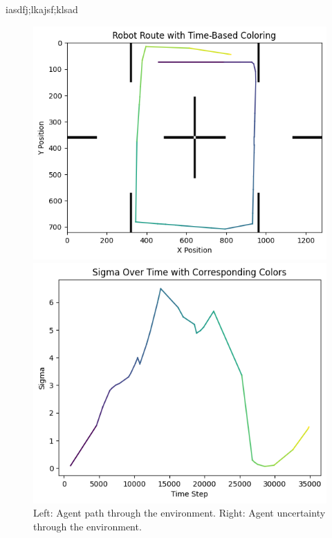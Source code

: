 \documentclass[12pt]{article}
\begin{document}
iasdfj;lkajsf;klsad
\begin{figure}[h]
    \centering
    \begin{minipage}{0.45\textwidth}
        \centering
        \includegraphics[width=\linewidth]{EKFgraph1}
    \end{minipage}
    \begin{minipage}{0.45\textwidth}
        \centering
        \includegraphics[width=\linewidth]{EKFgraph2}
    \end{minipage}
    \caption[Short caption]{Left: Agent path through the environment. Right: Agent uncertainty through the environment.}
    \label{fig:ekf_graphs}
\end{figure}
\end{document}

